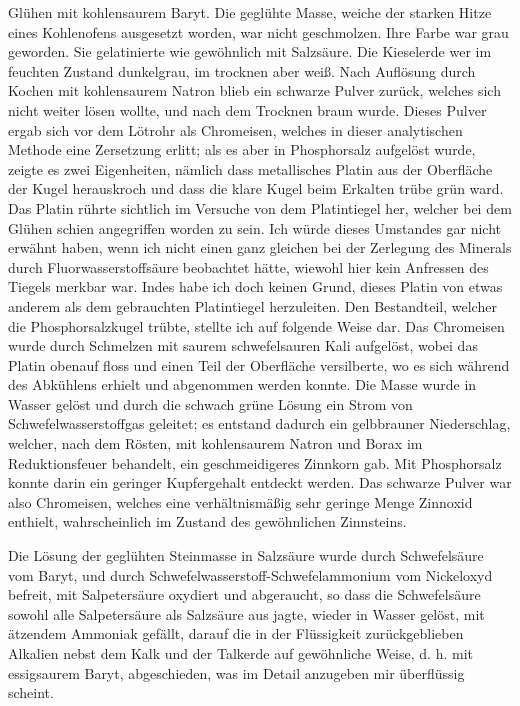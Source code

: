\documentclass[a4paper, 11pt, oneside]{article}
\begin{document}
Glühen mit kohlensaurem Baryt. Die geglühte Masse, weiche der starken Hitze eines Kohlenofens ausgesetzt worden, war nicht geschmolzen. Ihre Farbe war grau geworden. Sie gelatinierte wie gewöhnlich mit Salzsäure. Die Kieselerde wer im feuchten Zustand dunkelgrau, im trocknen aber weiß. Nach Auflösung durch Kochen mit kohlensaurem Natron blieb ein schwarze Pulver zurück, welches sich nicht weiter lösen wollte, und nach dem Trocknen braun wurde. Dieses Pulver ergab sich vor dem Lötrohr als Chromeisen, welches in dieser analytischen Methode eine Zersetzung erlitt; als es aber in Phosphorsalz aufgelöst wurde, zeigte es zwei Eigenheiten, nämlich dass metallisches Platin aus der Oberfläche der Kugel herauskroch und dass die klare Kugel beim Erkalten trübe grün ward. Das Platin rührte sichtlich im Versuche von dem Platintiegel her, welcher bei dem Glühen schien angegriffen worden zu sein. Ich würde dieses Umstandes gar nicht erwähnt haben, wenn ich nicht einen ganz gleichen bei der Zerlegung des Minerals durch Fluorwasserstoffsäure beobachtet hätte, wiewohl hier kein Anfressen des Tiegels merkbar war. Indes habe ich doch keinen Grund, dieses Platin von etwas anderem als dem gebrauchten Platintiegel herzuleiten. Den Bestandteil, welcher die Phosphorsalzkugel trübte, stellte ich auf folgende Weise dar. Das Chromeisen wurde durch Schmelzen mit saurem schwefelsauren Kali aufgelöst, wobei das Platin obenauf floss und einen Teil der Oberfläche versilberte, wo es sich während des Abkühlens erhielt und abgenommen werden konnte. Die Masse wurde in Wasser gelöst und durch die schwach grüne Lösung ein Strom von Schwefelwasserstoffgas geleitet; es entstand dadurch ein gelbbrauner Niederschlag, welcher, nach dem Rösten, mit kohlensaurem Natron und Borax im Reduktionsfeuer behandelt, ein geschmeidigeres Zinnkorn gab. Mit Phosphorsalz konnte darin ein geringer Kupfergehalt entdeckt werden. Das schwarze Pulver war also Chromeisen, welches eine verhältnismäßig sehr geringe Menge Zinnoxid enthielt, wahrscheinlich im Zustand des gewöhnlichen Zinnsteins.

Die Lösung der geglühten Steinmasse in Salzsäure wurde durch Schwefelsäure vom Baryt, und durch Schwefelwasserstoff-Schwefelammonium vom Nickeloxyd befreit, mit Salpetersäure oxydiert und abgeraucht, so dass die Schwefelsäure sowohl alle Salpetersäure als Salzsäure aus jagte, wieder in Wasser gelöst, mit ätzendem Ammoniak gefällt, darauf die in der Flüssigkeit zurückgeblieben Alkalien nebst dem Kalk und der Talkerde auf gewöhnliche Weise, d. h. mit essigsaurem Baryt, abgeschieden, was im Detail anzugeben mir überflüssig scheint.
\end{document}

